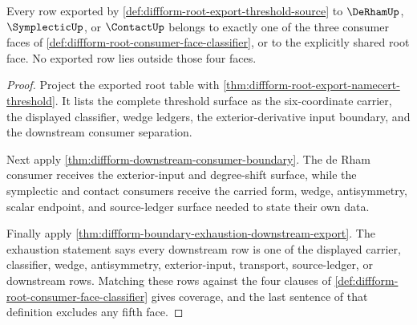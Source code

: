 \begin{theorem}
\label{thm:diffform-root-consumer-face-coverage}
Every row exported by \autoref{def:diffform-root-export-threshold-source} to
$\DeRhamUp$, $\SymplecticUp$, or $\ContactUp$ belongs to exactly one of the
three consumer faces of
\autoref{def:diffform-root-consumer-face-classifier}, or to the explicitly
shared root face. No exported row lies outside those four faces.
\end{theorem}
\begin{proof}
Project the exported root table with
\autoref{thm:diffform-root-export-namecert-threshold}. It lists the complete
threshold surface as the six-coordinate carrier, the displayed classifier,
wedge ledgers, the exterior-derivative input boundary, and the downstream
consumer separation.

Next apply \autoref{thm:diffform-downstream-consumer-boundary}. The de Rham
consumer receives the exterior-input and degree-shift surface, while the
symplectic and contact consumers receive the carried form, wedge, antisymmetry,
scalar endpoint, and source-ledger surface needed to state their own data.

Finally apply
\autoref{thm:diffform-boundary-exhaustion-downstream-export}. The
exhaustion statement says every downstream row is one of the displayed carrier,
classifier, wedge, antisymmetry, exterior-input, transport, source-ledger, or
downstream rows. Matching these rows against the four clauses of
\autoref{def:diffform-root-consumer-face-classifier} gives coverage, and the
last sentence of that definition excludes any fifth face.
\end{proof}

